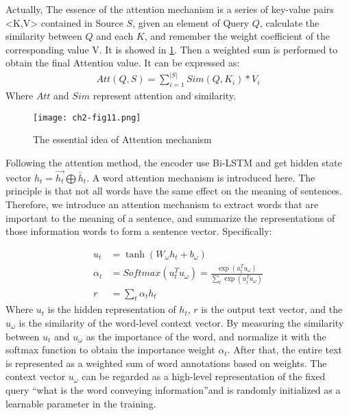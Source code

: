 Actually, The essence of the attention mechanism is a series of key-value pairs <K,V> contained in Source \(S\), given an element of Query \(Q\), calculate the similarity between \(Q\) and each \(K\), and remember the weight coefficient of the corresponding value V. It is showed in \figurename{\ref{ch2-fig10}}. Then a weighted sum is performed to obtain the final Attention value. It can be expressed as:
\begin{align}
	Att(Q,S) = \sum_{i=1}^{|S|}Sim(Q,K_i)*V_i
\end{align}
Where \(Att\) and \(Sim\) represent attention and similarity.

\begin{figure}[htbp!]
	\centering
	\texttt{[image: ch2-fig11.png]}
	\caption{The essential idea of Attention mechanism}\label{ch2-fig10}
\end{figure}
Following the attention method, the encoder use Bi-LSTM and get hidden state vector \(h_t=\overrightarrow{h_t}\bigoplus \overleftarrow{h_t}\). A word attention mechanism is introduced here. The principle is that not all words have the same effect on the meaning of sentences. Therefore, we introduce an attention mechanism to extract words that are important to the meaning of a sentence, and summarize the representations of those information words to form a sentence vector.
Specifically:



\begin{align}
	u_t      & = \tanh(W_\omega h_t + b_\omega )                                                    \\
	\alpha_t & =Softmax(u_t^T u_\omega) = \frac{\exp( u_t^T u_\omega)}{\sum_t \exp(u_t^T u_\omega)} \\
	r        & = \sum_t{\alpha_t h_t}
\end{align}
Where \(u_t\) is the hidden representation of \(h_t\), \(r\) is the output text vector, and the \(u_\omega \) is the similarity of the word-level context vector. By measuring the similarity between \(u_t\) and \(u_\omega \) as the importance of the word, and normalize it with the softmax function to obtain the importance weight \(\alpha_{t}\). After that, the entire text is represented as a weighted sum of word annotations based on weights. The context vector \(u_\omega \) can be regarded as a high-level representation of the fixed query ``what is the word conveying information''and is randomly initialized as a learnable parameter in the training.

